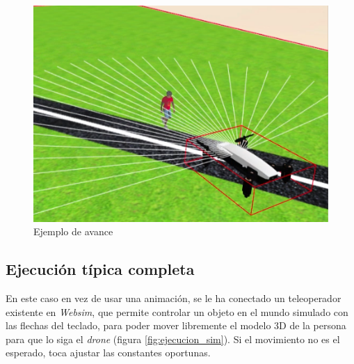 \begin{figure}[!htb]
\endminipage\hfill
{}
    \includegraphics[width=\linewidth]{figures/simulado/avance_3.png}
\endminipage\hfill
\caption{Ejemplo de avance}
\label{fig:sim_avance}
\end{figure}
\subsection{Ejecución típica completa}
En este caso en vez de usar una animación, se le ha conectado un teleoperador existente en \textit{Websim}, que permite controlar un objeto en el mundo simulado con las flechas del teclado, para poder mover libremente el modelo 3D de la persona para que lo siga el \textit{drone} (figura \ref{fig:ejecucion_sim}). Si el movimiento no es el esperado, toca ajustar las constantes oportunas.


